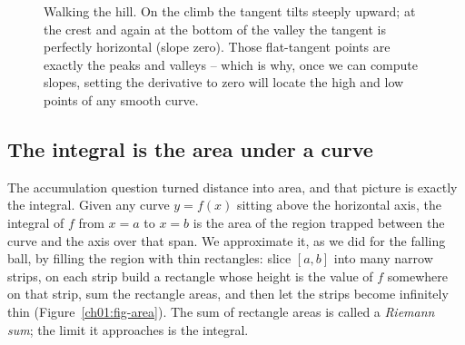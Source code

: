 \begin{figure}[H]
\centering
{}
\caption{Walking the hill. On the climb the tangent tilts steeply upward; at the
crest and again at the bottom of the valley the tangent is perfectly horizontal
(slope zero). Those flat-tangent points are exactly the peaks and valleys -- which
is why, once we can compute slopes, setting the derivative to zero will locate the
high and low points of any smooth curve.}
\label{ch01:fig-hill}
\end{figure}

\subsection{The integral is the area under a curve}

The accumulation question turned distance into area, and that picture is exactly
the integral. Given any curve $y = f(x)$ sitting above the horizontal axis, the
integral of $f$ from $x = a$ to $x = b$ is the area of the region trapped between
the curve and the axis over that span. We approximate it, as we did for the
falling ball, by filling the region with thin rectangles: slice $[a,b]$ into
many narrow strips, on each strip build a rectangle whose height is the value of
$f$ somewhere on that strip, sum the rectangle areas, and then let the strips
become infinitely thin (Figure~\ref{ch01:fig-area}). The sum of rectangle areas is
called a \emph{Riemann sum}; the limit it approaches is the integral.

